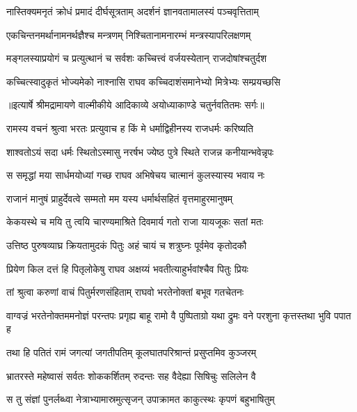 \twolineshloka
{नास्तिक्यमनृतं क्रोधं प्रमादं दीर्घसूत्रताम्}
{अदर्शनं ज्ञानवतामालस्यं पञ्चवृत्तिताम्} %

\twolineshloka
{एकचिन्तनमर्थानामनर्थज्ञैश्च मन्त्रणम्}
{निश्चितानामनारम्भं मन्त्रस्यापरिलक्षणम्} %

\twolineshloka
{मङ्गलस्याप्रयोगं च प्रत्युत्थानं च सर्वशः}
{कच्चित्त्वं वर्जयस्येतान् राजदोषांश्चतुर्दश} %

\twolineshloka
{कच्चित्स्वादुकृतं भोज्यमेको नाश्नासि राघव}
{कच्चिदाशंसमानेभ्यो मित्रेभ्यः सम्प्रयच्छसि} %


{॥इत्यार्षे श्रीमद्रामायणे वाल्मीकीये आदिकाव्ये अयोध्याकाण्डे चतुर्नवतितमः सर्गः॥}


\twolineshloka
{रामस्य वचनं श्रुत्वा भरतः प्रत्युवाच ह}
{किं मे धर्माद्विहीनस्य राजधर्मः करिष्यति} %

\twolineshloka
{शाश्वतोऽयं सदा धर्मः स्थितोऽस्मासु नरर्षभ}
{ज्येष्ठ पुत्रे स्थिते राजन्न कनीयान्भवेन्नृपः} %

\twolineshloka
{स समृद्धां मया सार्धमयोध्यां गच्छ राघव}
{अभिषेचय चात्मानं कुलस्यास्य भवाय नः} %

\twolineshloka
{राजानं मानुषं प्राहुर्देवत्वे सम्मतो मम}
{यस्य धर्मार्थसहितं वृत्तमाहुरमानुषम्} %

\twolineshloka
{केकयस्थे च मयि तु त्वयि चारण्यमाश्रिते}
{दिवमार्य गतो राजा यायजूकः सतां मतः} %

\twolineshloka
{उत्तिष्ठ पुरुषव्याघ्र क्रियतामुदकं पितुः}
{अहं चायं च शत्रुघ्नः पूर्वमेव कृतोदकौ} %

\twolineshloka
{प्रियेण किल दत्तं हि पितृलोकेषु राघव}
{अक्षय्यं भवतीत्याहुर्भवांश्चैव पितुः प्रियः} %

\twolineshloka
{तां श्रुत्वा करुणां वाचं पितुर्मरणसंहिताम्}
{राघवो भरतेनोक्तां बभूव गतचेतनः} %

\threelineshloka
{वाग्वज्रं भरतेनोक्तममनोज्ञं परन्तपः}
{प्रगृह्य बाहू रामो वै पुष्पिताग्रो यथा द्रुमः}
{वने परशुना कृत्तस्तथा भुवि पपात ह} %

\twolineshloka
{तथा हि पतितं रामं जगत्यां जगतीपतिम्}
{कूलघातपरिश्रान्तं प्रसुप्तमिव कुञ्जरम्} %

\twolineshloka
{भ्रातरस्ते महेष्वासं सर्वतः शोककर्शितम्}
{रुदन्तः सह वैदेह्या सिषिचुः सलिलेन वै} %

\twolineshloka
{स तु संज्ञां पुनर्लब्ध्वा नेत्राभ्यामास्रमुत्सृजन्}
{उपाक्रामत काकुत्स्थः कृपणं बहुभाषितुम्} %

